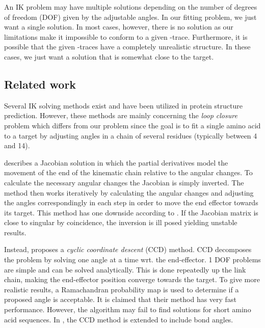 An IK problem may have multiple solutions depending on the number of degrees of freedom (DOF) given by the adjustable angles.
In our fitting problem, we just want a single solution.
In most cases, however, there is no solution as our limitations make it impossible to conform to a given \Ca-trace.
Furthermore, it is possible that the given \Ca-traces have a completely unrealistic structure.
In these cases, we just want a solution that is somewhat close to the target.


\subsection{Related work}
Several IK solving methods exist and have been utilized in protein structure prediction.
However, these methods are mainly concerning the \emph{loop closure} problem \cite{coutsias2004kinematic} which differs from our problem since the goal is to fit a single amino acid to a target by adjusting angles in a chain of several residues (typically between 4 and 14).
  
\cite{shenkin1987} describes a Jacobian solution in which the partial derivatives model the movement of the end of the kinematic chain relative to the angular changes.
To calculate the necessary angular changes the Jacobian is simply inverted.
The method then works iteratively by calculating the angular changes and adjusting the angles correspondingly in each step in order to move the end effector towards its target.
This method has one downside according to \cite{canutescu2003}.
If the Jacobian matrix is close to singular by coincidence, the inversion is ill posed yielding unstable results.

Instead, \cite{canutescu2003} proposes a \emph{cyclic coordinate descent} (CCD) method.
CCD decomposes the problem by solving one angle at a time wrt. the end-effector.
1 DOF problems are simple and can be solved analytically.
This is done repeatedly up the link chain, making the end-effector position converge towards the target.
To give more realistic results, a Ramachandran probability map is used to determine if a proposed angle is acceptable. 
It is claimed that their method has very fast performance. 
However, the algorithm may fail to find solutions for short amino acid sequences.
In \cite{boomsma2005full}, the CCD method is extended to include bond angles.

